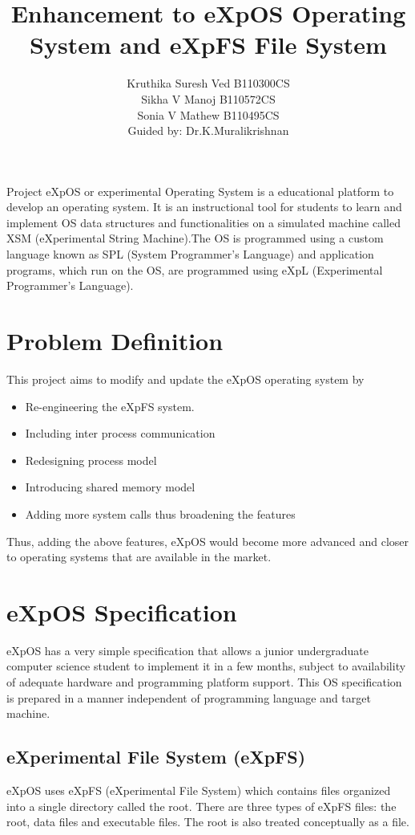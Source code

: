 \documentclass[11pt ,twosided]{article}
\title{Enhancement to eXpOS Operating System and eXpFS File System}
\author{ Kruthika Suresh Ved     B110300CS\\  Sikha V Manoj     B110572CS\\  Sonia V Mathew    B110495CS\\ Guided by: Dr.K.Muralikrishnan}
\begin{document}
\maketitle
	

\abstract{} 

Project eXpOS or experimental Operating System is a educational platform to develop an operating system. It is an instructional tool for students to learn and implement OS data structures and functionalities on a simulated machine called XSM (eXperimental String Machine).The OS is programmed using a custom language known as SPL (System Programmer's Language) and application programs, which run on the OS, are programmed using eXpL (Experimental Programmer's Language).


\section{Problem Definition}

This project aims to modify and update the eXpOS operating system by
\begin{itemize}
\item Re-engineering the eXpFS system. 
\item Including inter process communication
\item Redesigning process model 
\item Introducing shared memory model 
\item Adding more system calls thus broadening the features
\end {itemize}
Thus, adding the above features, eXpOS would become more advanced and closer to operating systems that are available in the market.
\section{eXpOS Specification}

eXpOS has a very simple specification that allows a junior undergraduate computer science student to implement it in a few months, subject to availability of adequate hardware and programming platform support. This OS specification is prepared in a manner independent of programming language and target machine.
\subsection{eXperimental File System (eXpFS)}

eXpOS uses eXpFS (eXperimental File System) which contains files organized into a single directory called the root. There are three types of eXpFS files: the root, data files and executable files. The root is also treated conceptually as a file.
\end{document}
